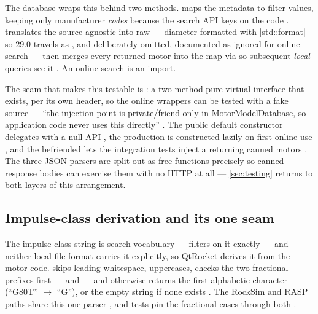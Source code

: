 The database wraps this behind two methods.  maps the
metadata to filter values, keeping only manufacturer \emph{codes} because the search API
keys on the code . 
translates the source-agnostic  into raw 
 --- diameter formatted with
\cppinline|std::format| so $29.0$ travels as 
, and  deliberately
omitted, documented as ignored for online search 
--- then merges every returned motor into the map via  so subsequent
\emph{local} queries see it . An online search is
an import.

The seam that makes this testable is 
: a two-method pure-virtual interface that exists, per
its own header, so the online wrappers can be tested with a fake source --- ``the
injection point is private/friend-only in MotorModelDatabase, so application code never
uses this directly'' . The public default constructor
delegates with a null API , the production
 is constructed lazily on first online use
, and the befriended
 lets the integration tests inject a
 returning canned motors
. The three JSON parsers are split out
as free functions precisely so canned response bodies can exercise them with no HTTP at
all  --- \cref{sec:testing} returns to both layers of
this arrangement.

\subsection{Impulse-class derivation and its one seam}\label{sec:motors-class}

The impulse-class string is search vocabulary ---  filters on it exactly
 --- and neither local file format carries it
explicitly, so QtRocket derives it from the motor code.
  skips leading
whitespace, uppercases, checks the two fractional prefixes first ---
 and 
 --- and otherwise returns the first alphabetic character
(``G80T'' $\to$ ``G''), or the empty string if none exists
. The RockSim and RASP paths share this one parser
 , and tests pin the
fractional cases through both 
.

